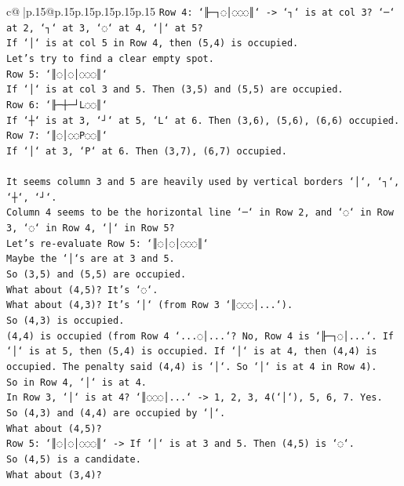 \documentclass{article}
\begin{document}
{\begin{supertabular}{c@{$\;$}|p{.15\linewidth}@{}p{.15\linewidth}p{.15\linewidth}p{.15\linewidth}p{.15\linewidth}p{.15\linewidth}}
{{{\texttt{Row 4: `╟─┐◌│◌◌◌║` {-}> `┐` is at col 3? `─` at 2, `┐` at 3, `◌` at 4, `│` at 5?} \\
\texttt{If `│` is at col 5 in Row 4, then (5,4) is occupied.} \\
\texttt{Let's try to find a clear empty spot.} \\
\texttt{Row 5: `║◌│◌│◌◌◌║`} \\
\texttt{If `│` is at col 3 and 5. Then (3,5) and (5,5) are occupied.} \\
\texttt{Row 6: `╟─┼─┘L◌◌║`} \\
\texttt{If `┼` is at 3, `┘` at 5, `L` at 6. Then (3,6), (5,6), (6,6) occupied.} \\
\texttt{Row 7: `║◌│◌◌P◌◌║`} \\
\texttt{If `│` at 3, `P` at 6. Then (3,7), (6,7) occupied.} \\
\\ 
\texttt{It seems column 3 and 5 are heavily used by vertical borders `│`, `┐`, `┼`, `┘`.} \\
\texttt{Column 4 seems to be the horizontal line `─` in Row 2, and `◌` in Row 3, `◌` in Row 4, `│` in Row 5?} \\
\texttt{Let's re{-}evaluate Row 5: `║◌│◌│◌◌◌║`} \\
\texttt{Maybe the `│`s are at 3 and 5.} \\
\texttt{So (3,5) and (5,5) are occupied.} \\
\texttt{What about (4,5)? It's `◌`.} \\
\texttt{What about (4,3)? It's `│` (from Row 3 `║◌◌◌│...`).} \\
\texttt{So (4,3) is occupied.} \\
\texttt{(4,4) is occupied (from Row 4 `...◌│...`? No, Row 4 is `╟─┐◌│...`. If `│` is at 5, then (5,4) is occupied. If `│` is at 4, then (4,4) is occupied. The penalty said (4,4) is `│`. So `│` is at 4 in Row 4).} \\
\texttt{So in Row 4, `│` is at 4.} \\
\texttt{In Row 3, `│` is at 4? `║◌◌◌│...` {-}> 1, 2, 3, 4(`│`), 5, 6, 7. Yes.} \\
\texttt{So (4,3) and (4,4) are occupied by `│`.} \\
\texttt{What about (4,5)?} \\
\texttt{Row 5: `║◌│◌│◌◌◌║` {-}> If `│` is at 3 and 5. Then (4,5) is `◌`.} \\
\texttt{So (4,5) is a candidate.} \\
\texttt{What about (3,4)?} \\
}}}
\end{supertabular}}
\end{document}
